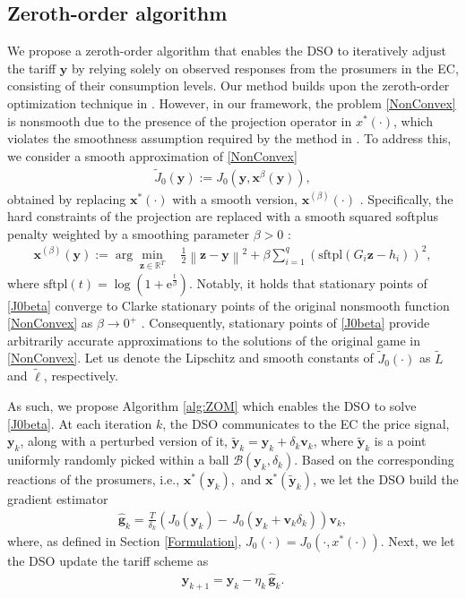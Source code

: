 \documentclass[letterpaper, 10 pt, conference]{ieeeconf}
\newcommand{\real}{\mathbb{R}}
\newcommand\gbf{\mathbf{g}}
\newcommand\vbf{\mathbf{v}}
\newcommand\xbf{\mathbf{x}}
\newcommand\ybf{\mathbf{y}}
\newcommand\zbf{\mathbf{z}}
\begin{document}
\subsection{Zeroth-order algorithm} 
We propose a zeroth-order algorithm that enables the DSO to iteratively adjust the tariff $\ybf$ by relying solely on observed responses from the prosumers in the EC, consisting of their consumption levels. Our method builds upon the zeroth-order optimization technique in \cite[Algorithm 1]{maheshwari2024follower}. However, in our framework, the problem \eqref{NonConvex} is nonsmooth due to the presence of the projection operator in $x^*(\cdot)$, which violates the smoothness assumption required by the method in \cite{maheshwari2024follower}.
To address this, we consider a smooth approximation of \eqref{NonConvex}
\begin{align}\label{J0beta}
    \tilde{J}_0(\ybf):=J_0(\ybf, \xbf^{\beta}(\ybf)), 
\end{align}
obtained by replacing $\xbf^*(\cdot)$ with a smooth version, $\xbf^{(\beta)}(\cdot)$ \cite{nesterov2005smooth}. Specifically, the hard constraints of the projection are replaced with a smooth squared softplus penalty weighted by a smoothing parameter $\beta >0$ \cite[Eq. (2)]{li2025new}: 
 \begin{align*}
 \xbf^{(\beta)}(\ybf) := \arg \min\limits_{\zbf \in \real^T}\,&{\frac{1}{2} \left\|\zbf-\ybf\right\|^2 + \beta \sum_{i=1}^{q}(\mathrm{sftpl}(G_i\zbf-h_i))^2},
 \end{align*}
 where $\mathrm{sftpl}(t)=\log(1+\mathrm{e}^{\frac{t}{\beta}})$. 
 Notably, it holds that stationary points of \eqref{J0beta} converge to Clarke stationary points of the original nonsmooth function \eqref{NonConvex} as $\beta \to 0^+$ \cite[Theorem 1]{nesterov2005smooth}\cite[Proposition 2.2.2]{clarke1990optimization}. Consequently, stationary points of \eqref{J0beta} provide arbitrarily accurate approximations to the solutions of the original game in \eqref{NonConvex}.
 Let us denote the Lipschitz and smooth constants of $\tilde{J}_0(\cdot)$ as $\tilde{L}$ and $\tilde{\ell}$, respectively.
 
 As such, we propose Algorithm \ref{alg:ZOM} which enables the DSO to solve \eqref{J0beta}. At each iteration $k$, the DSO communicates to the EC the price signal, $\ybf_k$, along with a perturbed version of it, $\tilde{\ybf}_k=\ybf_k+\delta_k\vbf_k$, where $\tilde{\ybf}_k$ is a point uniformly randomly picked within a ball $\mathcal{B}(\ybf_k, \delta_k)$. Based on the corresponding reactions of the prosumers, i.e., $\xbf^*(\ybf_k),$ and $ \xbf^*(\tilde{\ybf}_k)$, we let the DSO build the gradient estimator
\begin{align}\label{Est}
     \hat{\gbf}_k=\frac{T}{\delta_k}(J_0(\ybf_k)- \,J_0(\ybf_k+\vbf_k\delta_k))\vbf_k,
 \end{align}
 where, as defined in Section \ref{Formulation}, $J_0(\cdot)=J_0(\cdot, x^*(\cdot))$.
 Next, we let the DSO update the tariff scheme as
 \begin{align}\label{Update}
    \ybf_{k+1}=\ybf_k-\eta_k\,\hat{\gbf}_k.
\end{align}
\end{document}
